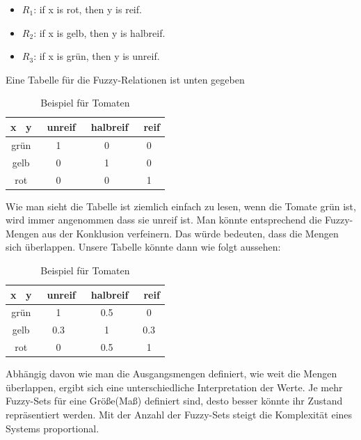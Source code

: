 \begin{itemize}
	\item $R_1$: if x is rot, then y is reif.
	\item $R_2$: if x is gelb, then y is halbreif.
	\item $R_3$: if x is grün, then y is unreif.
\end{itemize}

Eine Tabelle für die Fuzzy-Relationen ist unten gegeben

\begin{table}\label{tomato:1}
	\centering
	\begin{tabular}{c|c c c}
		
		x \diagdown \ y & \ unreif & \ halbreif & \ reif \\ [0.5ex]
		\hline
		grün & 1 & 0 & 0 \\ 
		gelb & 0 & 1 & 0\\
		rot  & 0 & 0 & 1\\
		
	\end{tabular}
\caption{Beispiel für Tomaten}

\end{table}

Wie man sieht die Tabelle ist ziemlich einfach zu lesen, wenn die Tomate grün ist, wird immer angenommen dass sie unreif ist. Man könnte entsprechend die Fuzzy-Mengen aus der Konklusion verfeinern. Das würde bedeuten, dass die Mengen sich überlappen. Unsere Tabelle könnte dann wie folgt aussehen:

\begin{table}
	\centering
	\begin{tabular}{c|c c c}
		
		x \diagdown \ y & \ unreif & \ halbreif & \ reif \\ [0.5ex]
		\hline
		grün & 1 & 0.5 & 0 \\ 
		gelb & 0.3 & 1 & 0.3\\
		rot  & 0 & 0.5 & 1\\
		
	\end{tabular}
	\caption{Beispiel für Tomaten}
	\label{table:1}
\end{table}

Abhängig davon wie man die Ausgangsmengen definiert, wie weit die Mengen überlappen, ergibt sich eine unterschiedliche Interpretation der Werte. Je mehr Fuzzy-Sets für eine Größe(Maß) definiert sind, desto besser könnte ihr Zustand repräsentiert werden. Mit der Anzahl der Fuzzy-Sets steigt die Komplexität eines Systems proportional.

